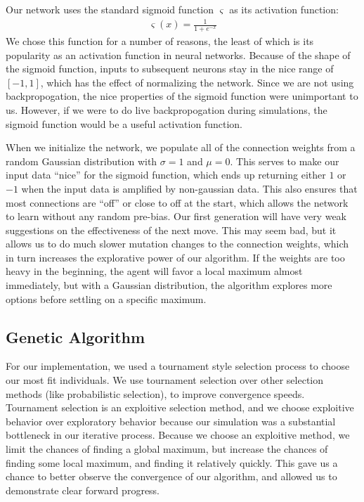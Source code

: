 \documentclass{article}
\begin{document}
\begin{multicols}{2}
Our network uses the standard sigmoid function $\varsigma$ as its activation
function:
\begin{align*}
  \varsigma(x) = \frac{1}{1 + e^{-x}}
\end{align*}
We chose this function for a number of reasons, the least of which is its
popularity as an activation function in neural networks. Because of the shape
of the sigmoid function, inputs to subsequent neurons stay in the nice range of
$[-1, 1]$, which has the effect of normalizing the network. Since we are not
using backpropogation, the nice properties of the sigmoid function were
unimportant to us. However, if we were to do live backpropogation during
simulations, the sigmoid function would be a useful activation function.

When we initialize the network, we populate all of the connection weights from
a random Gaussian distribution with $\sigma = 1$ and $\mu = 0$. This serves to
make our input data ``nice'' for the sigmoid function, which ends up returning
either $1$ or $-1$ when the input data is amplified by non-gaussian data. This
also ensures that most connections are ``off'' or close to off at the start,
which allows the network to learn without any random pre-bias. Our first
generation will have very weak suggestions on the effectiveness of the next
move. This may seem bad, but it allows us to do much slower mutation changes to
the connection weights, which in turn increases the explorative power of our
algorithm. If the weights are too heavy in the beginning, the agent will favor
a local maximum almost immediately, but with a Gaussian distribution, the
algorithm explores more options before settling on a specific maximum.

\subsection{Genetic Algorithm}
For our implementation, we used a tournament style selection process to choose
our most fit individuals. We use tournament selection over other selection
methods (like probabilistic selection), to improve convergence speeds.
Tournament selection is an exploitive selection method, and we choose exploitive
behavior over exploratory behavior because our simulation was a substantial
bottleneck in our iterative process. Because we choose an exploitive method, we
limit the chances of finding a global maximum, but increase the chances of
finding some local maximum, and finding it relatively quickly. This gave us a
chance to better observe the convergence of our algorithm, and allowed us to
demonstrate clear forward progress.


\end{multicols}
\end{document}

